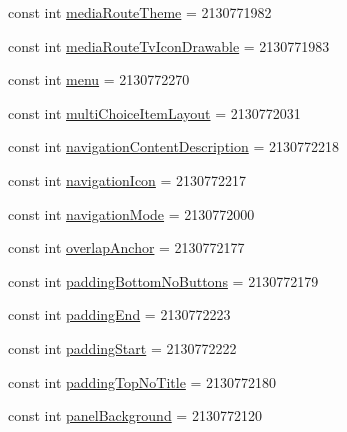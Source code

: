 \begin{DoxyCompactItemize}
const int \mbox{\hyperlink{class_f_w_p_s___app_1_1_droid_1_1_resource_1_1_attribute_a4d7867c7b09c53c3ce919e05a626dad1}{media\+Route\+Theme}} = 2130771982
\item 
const int \mbox{\hyperlink{class_f_w_p_s___app_1_1_droid_1_1_resource_1_1_attribute_a8db150d86ee6f312b596ebf107b69e3b}{media\+Route\+Tv\+Icon\+Drawable}} = 2130771983
\item 
const int \mbox{\hyperlink{class_f_w_p_s___app_1_1_droid_1_1_resource_1_1_attribute_af8fa7585b209641d461eccdef4949768}{menu}} = 2130772270
\item 
const int \mbox{\hyperlink{class_f_w_p_s___app_1_1_droid_1_1_resource_1_1_attribute_ae4f8efbe4d0229a73cf6ff325580d090}{multi\+Choice\+Item\+Layout}} = 2130772031
\item 
const int \mbox{\hyperlink{class_f_w_p_s___app_1_1_droid_1_1_resource_1_1_attribute_a932c22278bdbd1a76152550fafdaa7cb}{navigation\+Content\+Description}} = 2130772218
\item 
const int \mbox{\hyperlink{class_f_w_p_s___app_1_1_droid_1_1_resource_1_1_attribute_aa3ab5647573aec8dc63644e775b375b4}{navigation\+Icon}} = 2130772217
\item 
const int \mbox{\hyperlink{class_f_w_p_s___app_1_1_droid_1_1_resource_1_1_attribute_a4b75f2fb9c2ddd0fafb5257b57dfea66}{navigation\+Mode}} = 2130772000
\item 
const int \mbox{\hyperlink{class_f_w_p_s___app_1_1_droid_1_1_resource_1_1_attribute_af9bf260305025cb79a767d212205f155}{overlap\+Anchor}} = 2130772177
\item 
const int \mbox{\hyperlink{class_f_w_p_s___app_1_1_droid_1_1_resource_1_1_attribute_a12dc749edd610d48245b16c92cc617c8}{padding\+Bottom\+No\+Buttons}} = 2130772179
\item 
const int \mbox{\hyperlink{class_f_w_p_s___app_1_1_droid_1_1_resource_1_1_attribute_a2d35c2f161043bb7f55149d8237a1682}{padding\+End}} = 2130772223
\item 
const int \mbox{\hyperlink{class_f_w_p_s___app_1_1_droid_1_1_resource_1_1_attribute_af8d20ee59b186a046bbd5b307ffc0cd2}{padding\+Start}} = 2130772222
\item 
const int \mbox{\hyperlink{class_f_w_p_s___app_1_1_droid_1_1_resource_1_1_attribute_aa0735321fa5cc6b90ce97d05f463fe0a}{padding\+Top\+No\+Title}} = 2130772180
\item 
const int \mbox{\hyperlink{class_f_w_p_s___app_1_1_droid_1_1_resource_1_1_attribute_ab2191d92c78e645c20dd53362aa9b2b4}{panel\+Background}} = 2130772120
\item 

\end{DoxyCompactItemize}

